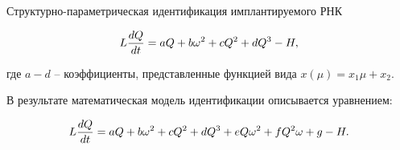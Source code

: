 \documentclass[a4paper, 9pt]{beamer}
\begin{document}
\begin{frame}{Структурно-параметрическая идентификация имплантируемого РНК}
\begin{minipage}[ht]{0.62\textwidth}
\vskip-5pt
\begin{equation}
	\setcounter{equation}{2}
	L\frac{dQ}{dt} = aQ + b\omega^2 + cQ^2 + dQ^3 - H,
\end{equation}

\vskip-4pt
где $a-d$ -- коэффициенты, представленные функцией вида $x(\mu) = x_1\mu + x_2$.

В результате математическая модель идентификации описывается уравнением:

\vskip-2pt
\vskip-3pt
\begin{equation}
	\setcounter{equation}{3}
	L\frac{dQ}{dt} = aQ + b\omega^2 + cQ^2 + dQ^3 + eQ\omega^2 + fQ^2\omega + g - H.
\end{equation}






\end{minipage}
\end{frame}
\end{document}
